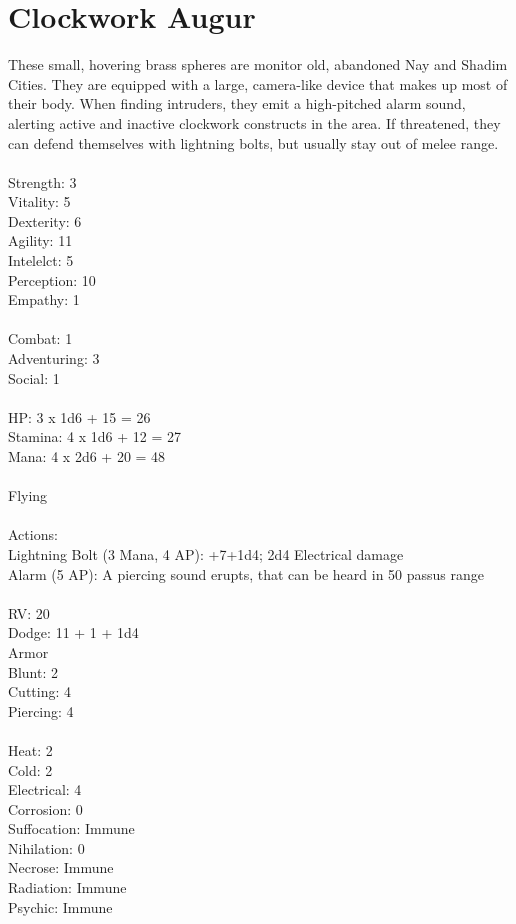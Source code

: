 \pagebreak
\section{Clockwork Augur}

These small, hovering brass spheres are monitor old, abandoned Nay and Shadim Cities. They are equipped with a large, camera-like device that makes up most of their body. When finding intruders, they emit a high-pitched alarm sound, alerting active and inactive clockwork constructs in the area. If threatened, they can defend themselves with lightning bolts, but usually stay out of melee range.\\
\\
Strength: 3\\
Vitality: 5\\
Dexterity: 6\\
Agility: 11\\
Intelelct: 5\\
Perception: 10\\
Empathy: 1\\
\\
Combat: 1\\
Adventuring: 3\\
Social: 1\\
\\
HP: 3 x 1d6 + 15 = 26\\
Stamina: 4 x 1d6 + 12 = 27\\
Mana: 4 x 2d6 + 20 = 48\\
\\
Flying\\
\\
Actions:\\
Lightning Bolt (3 Mana, 4 AP): +7+1d4; 2d4 Electrical damage\\
Alarm (5 AP): A piercing sound erupts, that can be heard in 50 passus range\\
\\
RV: 20\\
Dodge: 11 + 1 + 1d4\\
Armor\\
Blunt: 2\\
Cutting: 4\\
Piercing: 4\\
\\
Heat: 2\\
Cold: 2\\
Electrical: 4\\
Corrosion: 0\\
Suffocation: Immune\\
Nihilation: 0\\
Necrose: Immune\\
Radiation: Immune\\
Psychic: Immune\\